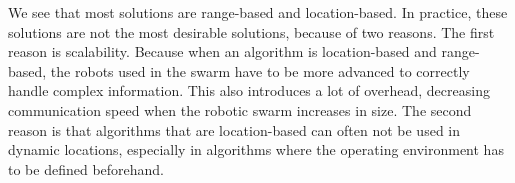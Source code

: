 We see that most solutions are range-based and location-based. 
In practice, these solutions are not the most desirable solutions, because of two reasons. 
The first reason is scalability. 
Because when an algorithm is location-based and range-based, the robots used in the swarm have to be more advanced to correctly handle complex information. 
This also introduces a lot of overhead, decreasing communication speed when the robotic swarm increases in size. 
The second reason is that algorithms that are location-based can often not be used in dynamic locations, especially in algorithms where the operating environment has to be defined beforehand. 